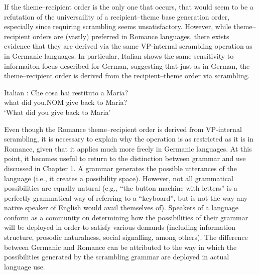 If the theme--recipient order is the only one that occurs, that would seem to be a refutation of the universaility of a recipient--theme base generation order, especially since requiring scrambling seems unsatisfactory. However, while theme--recipient orders are (vastly) preferred in Romance languages, there exists evidence that they are derived via the same VP-internal scrambling operation as in Germanic languages. In particular, Italian shows the same sensitivity to informaiton focus described for German, suggesting that just as in German, the theme--recipient order is derived from the recipient--theme order via scrambling.

\begin{exe}
\ex Italian \citep[ex 26]{Belletti.1995}:
\gll Che cosa hai restituto a Maria?\\
what did you.NOM {give back} to Maria?\\
\trans `What did you give back to Maria'
\begin{xlist}
\end{xlist} 
\end{exe}%

Even though the Romance theme--recipient order is derived from VP-internal scrambling, it is necessary to explain why the operation is as restricted as it is in Romance, given that it applies much more freely in Germanic languages. At this point, it becomes useful to return to the distinction between grammar and use discussed in Chapter 1. A grammar generates the possible utterances of the language (i.e., it creates a possibility space). However, not all grammatical possibilities are equally natural (e.g., ``the button machine with letters'' is a perfectly grammatical way of referring to a ``keyboard'', but is not the way any native speaker of English would avail themselves of). Speakers of a language conform as a community on determining how the possibilities of their grammar will be deployed in order to satisfy various demands (including information structure, prosodic naturalness, social signalling, among others). The difference between Germanic and Romance can be attributed to the way in which the possibilities generated by the scrambling grammar are deployed in actual language use.

